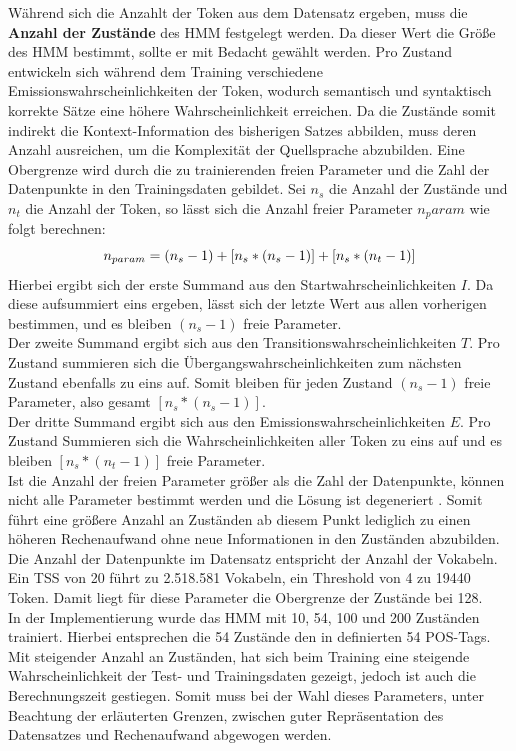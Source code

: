 \documentclass[conference]{IEEEtran}
\begin{document}
Während sich die Anzahlt der Token aus dem Datensatz ergeben, muss die \textbf{Anzahl der Zustände} des HMM festgelegt werden. 
Da dieser Wert die Größe des HMM bestimmt, sollte er mit Bedacht gewählt werden.
Pro Zustand entwickeln sich während dem Training verschiedene Emissionswahrscheinlichkeiten der Token, wodurch semantisch und syntaktisch korrekte Sätze eine höhere Wahrscheinlichkeit erreichen.
Da die Zustände somit indirekt die Kontext-Information des bisherigen Satzes abbilden, muss deren Anzahl ausreichen, um die Komplexität der Quellsprache abzubilden.
Eine Obergrenze wird durch die zu trainierenden freien Parameter und die Zahl der Datenpunkte in den Trainingsdaten gebildet.
Sei $n_s$ die Anzahl der Zustände und $n_t$ die Anzahl der Token, so lässt sich die Anzahl freier Parameter $n_param$ wie folgt berechnen:
\begin{equation}\notag
n_{param} = (n_s-1) + [n_s * (n_s-1)] + [n_s * (n_t-1)]
\end{equation}
Hierbei ergibt sich der erste Summand aus den Startwahrscheinlichkeiten $I$. Da diese aufsummiert eins ergeben, lässt sich der letzte Wert aus allen vorherigen bestimmen, und es bleiben $(n_s-1)$ freie Parameter.\\
Der zweite Summand ergibt sich aus den Transitionswahrscheinlichkeiten $T$.
Pro Zustand summieren sich die Übergangswahrscheinlichkeiten zum nächsten Zustand ebenfalls zu eins auf.
Somit bleiben für jeden Zustand $(n_s-1)$ freie Parameter, also gesamt $[n_s * (n_s-1)]$.\\
Der dritte Summand ergibt sich aus den Emissionswahrscheinlichkeiten $E$.
Pro Zustand Summieren sich die Wahrscheinlichkeiten aller Token zu eins auf und es bleiben $[n_s * (n_t-1)]$ freie Parameter.\\
Ist die Anzahl der freien Parameter größer als die Zahl der Datenpunkte, können nicht alle Parameter bestimmt werden und die Lösung ist degeneriert \cite{degenerate}.
Somit führt eine größere Anzahl an Zuständen ab diesem Punkt lediglich zu einen höheren Rechenaufwand ohne neue Informationen in den Zuständen abzubilden.\\
Die Anzahl der Datenpunkte im Datensatz entspricht der Anzahl der Vokabeln.
Ein TSS von 20 führt zu 2.518.581 Vokabeln, ein Threshold von 4 zu 19440 Token. 
Damit liegt für diese Parameter die Obergrenze der Zustände bei 128. \\
In der Implementierung wurde das HMM mit 10, 54, 100 und 200 Zuständen trainiert.
Hierbei entsprechen die 54 Zustände den in \cite{germanCorpus} definierten 54 POS-Tags.
Mit steigender Anzahl an Zuständen, hat sich beim Training eine steigende Wahrscheinlichkeit der Test- und Trainingsdaten gezeigt, jedoch ist auch die Berechnungszeit gestiegen.
Somit muss bei der Wahl dieses Parameters, unter Beachtung der erläuterten Grenzen, zwischen guter Repräsentation des Datensatzes und Rechenaufwand abgewogen werden.
\end{document}
